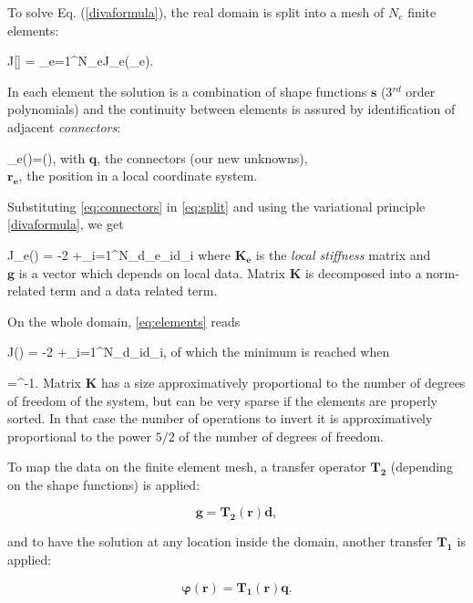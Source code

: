 To solve Eq. (\ref{divaformula}), the real domain is split into a mesh of $N_e$ finite elements:

\be
J[\varphi] = \sum_{e=1}^{N_{e}}J_{e}(\varphi_{e}).
\label{eq:split}
\ee

In each element the solution is a combination of shape functions $\mathbf{s}$ (3$^{rd}$ order polynomials) and the continuity between elements is assured by identification of adjacent \textit{connectors}:

\be
\varphi_{e}()=(),
\label{eq:connectors}
\ee
with $\mathbf{q}$, the connectors (our new unknowns),\\
\hphantom{with} $\mathbf{r_e}$, the position in a local coordinate system.

Substituting \eqref{eq:connectors} in \eqref{eq:split} and using the variational principle \eqref{divaformula}, we get

\be
J_{e}() = -2 +\sum_{i=1}^{N_{d_{e}}}\mu_{i}d_{i}
\label{eq:elements}
\ee
where $\mathbf{K_e}$ is the \textit{local stiffness} matrix and\\
\hphantom{where} $\mathbf{g}$ is a vector which depends on local data. Matrix $\mathbf{K}$ is decomposed into a norm-related term and a data related term.

On the whole domain, \eqref{eq:elements} reads

\be
J() = -2 +\sum_{i=1}^{N_{d}}\mu_{i}d_{i},
\label{eq:domain}
\ee
of which the minimum is reached when

\be
{}=^{-1}.
\label{eq:solution}
\ee
Matrix $\mathbf{K}$ has a size approximatively proportional to the number of degrees of freedom of the system, but can be very sparse if the elements are properly sorted. In that case the number of operations to invert it is approximatively proportional to the power $5/2$ of the number of degrees of freedom.

To map the data on the finite element mesh, a transfer operator $\mathbf{T_{2}}$ (depending on the shape functions) is applied:

\[\mathbf{g}=\mathbf{T_2}(\mathbf{r})\mathbf{d},\]

and to have the solution at any location inside the domain, another transfer $\mathbf{T_{1}}$ is applied:

\[\boldsymbol{\varphi}(\mathbf{r})=\mathbf{T_1}(\mathbf{r})\mathbf{q}.\]

